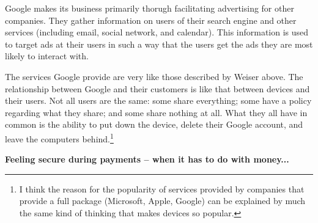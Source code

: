 Google makes its business primarily thorugh facilitating advertising for other companies. They gather information on users of
their search engine and other services (including email, social network, and calendar). This information is used to target ads
at their users in such a way that the users get the ads they are most likely to interact with.

The services Google provide are very like those described by Weiser above. The relationship between Google and their customers
is like that between devices and their users. Not all users are the same: some share everything; some have a policy regarding
what they share; and some share nothing at all. What they all have in common is the ability to put down the device, delete their
Google account, and leave the computers behind.\footnote{I think the reason for the popularity of services provided by companies
that provide a full package (Microsoft, Apple, Google) can be explained by much the same kind of thinking that makes devices so
popular.}

\textbf{Feeling secure during payments -- when it has to do with money...}